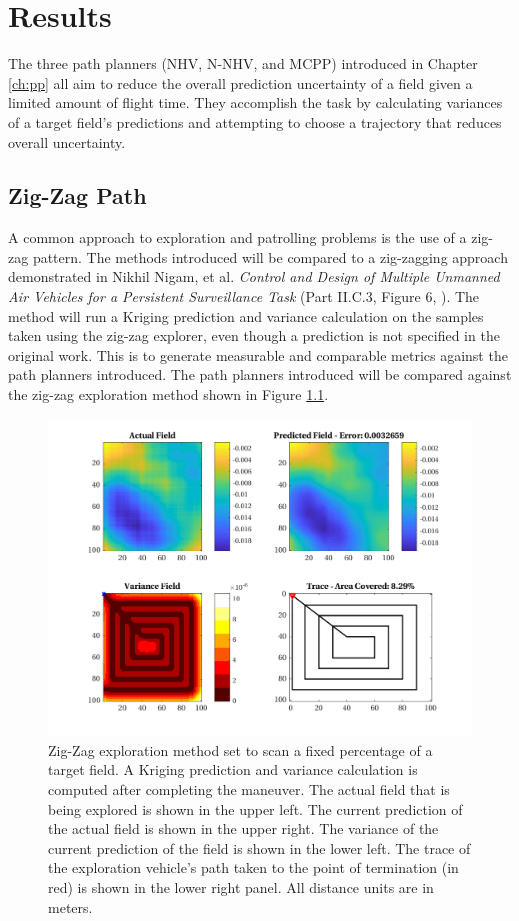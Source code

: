 \chapter{Results}
The three path planners (NHV, N-NHV, and MCPP) introduced in Chapter \ref{ch:pp} all aim to reduce the overall prediction uncertainty of a field given a limited amount of flight time. They accomplish the task by calculating variances of a target field's predictions and attempting to choose a trajectory that reduces overall uncertainty. 

\section{Zig-Zag Path}
A common approach to exploration and patrolling problems is the use of a zig-zag pattern. The methods introduced will be compared to a zig-zagging approach demonstrated in Nikhil Nigam, et al. \textit{Control and Design of Multiple Unmanned Air Vehicles for a Persistent Surveillance Task} (Part II.C.3, Figure 6, \cite{nigam:zigzag}). The method will run a Kriging prediction and variance calculation on the samples taken using the zig-zag explorer, even though a prediction is not specified in the original work. This is to generate measurable and comparable metrics against the path planners introduced. The path planners introduced will be compared against the zig-zag exploration method shown in Figure \ref{fig:zigzag4}.

\begin{figure}[hbt!]
    \centering
    \includegraphics[width=0.9\linewidth]{figures/hbresults/zz_10p_100x100_sf_25_seed_2.png}
    \captionsetup{skip=0.20\baselineskip}
    \ssp
    \caption{Zig-Zag exploration method set to scan a fixed percentage of a target field. A Kriging prediction and variance calculation is computed after completing the maneuver. The actual field that is being explored is shown in the upper left. The current prediction of the actual field is shown in the upper right. The variance of the current prediction of the field is shown in the lower left. The trace of the exploration vehicle's path taken to the point of termination (in red) is shown in the lower right panel. All distance units are in meters.}
    \label{fig:zigzag4}
\end{figure}

